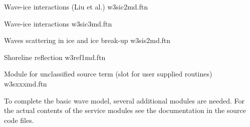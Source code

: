 \noindent
Wave-ice interactions (Liu et al.) \hfill {\file w3sic2md.ftn}

\begin{flisti}
\end{flisti}

\noindent
Wave-ice interactions \cite{art:WS10} \hfill {\file w3sic3md.ftn}

\begin{flisti}
\end{flisti}

\begin{flisti}
\end{flisti}

\noindent
Waves scattering in ice and ice break-up \hfill {\file w3sis2md.ftn}

\noindent
Shoreline reflection \hfill {\file w3ref1md.ftn}

\begin{flisti}
\end{flisti}

\noindent
Module for unclassified source term (slot for user supplied routines) \hfill
{\file w3sxxxmd.ftn}

\begin{flisti}
\end{flisti}

\noindent
To complete the basic wave model, several additional modules are needed. For
the actual contents of the service modules see the documentation in the source
code files.

